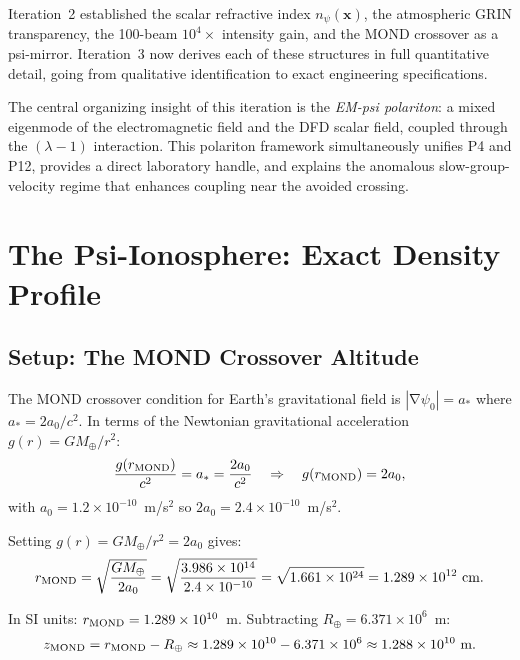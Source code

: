\documentclass[aps,prd,twocolumn,superscriptaddress]{revtex4-2}
\newcommand{\npsi}{n_\psi}
\DeclareMathOperator{\grad}{\nabla}
\begin{document}
Iteration~2 established the scalar refractive index $\npsi(\mathbf{x})$,
the atmospheric GRIN transparency, the 100-beam $10^4\times$ intensity
gain, and the MOND crossover as a psi-mirror.  Iteration~3 now derives
each of these structures in full quantitative detail, going from
qualitative identification to exact engineering specifications.

The central organizing insight of this iteration is the \emph{EM-psi
polariton}: a mixed eigenmode of the electromagnetic field and the
DFD scalar field, coupled through the $(\lambda-1)$ interaction.
This polariton framework simultaneously unifies P4 and P12, provides
a direct laboratory handle, and explains the anomalous slow-group-velocity
regime that enhances coupling near the avoided crossing.

\section{The Psi-Ionosphere: Exact Density Profile}
\label{sec:psi-iono}

\subsection{Setup: The MOND Crossover Altitude}

The MOND crossover condition for Earth's gravitational field is
$|\grad\psi_0| = a_*$ where $a_* = 2a_0/c^2$.  In terms of the
Newtonian gravitational acceleration $g(r) = GM_\oplus/r^2$:
\begin{equation}
\frac{g(r_{\rm MOND})}{c^2} = a_* = \frac{2a_0}{c^2}
\quad\Rightarrow\quad
g(r_{\rm MOND}) = 2a_0,
\label{eq:mond-cond}
\end{equation}
with $a_0 = 1.2\times10^{-10}$~m/s$^2$ so $2a_0 = 2.4\times10^{-10}$~m/s$^2$.

Setting $g(r) = GM_\oplus/r^2 = 2a_0$ gives:
\begin{equation}
r_{\rm MOND} = \sqrt{\frac{GM_\oplus}{2a_0}}
= \sqrt{\frac{3.986\times10^{14}}{2.4\times10^{-10}}}
= \sqrt{1.661\times10^{24}}
= 1.289\times10^{12}~\text{cm}.
\label{eq:r-mond}
\end{equation}

In SI units: $r_{\rm MOND} = 1.289\times10^{10}$~m.  Subtracting
$R_\oplus = 6.371\times10^6$~m:
\begin{equation}
z_{\rm MOND} = r_{\rm MOND} - R_\oplus
\approx 1.289\times10^{10} - 6.371\times10^6
\approx 1.288\times10^{10}~\text{m}.
\end{equation}
\end{document}
